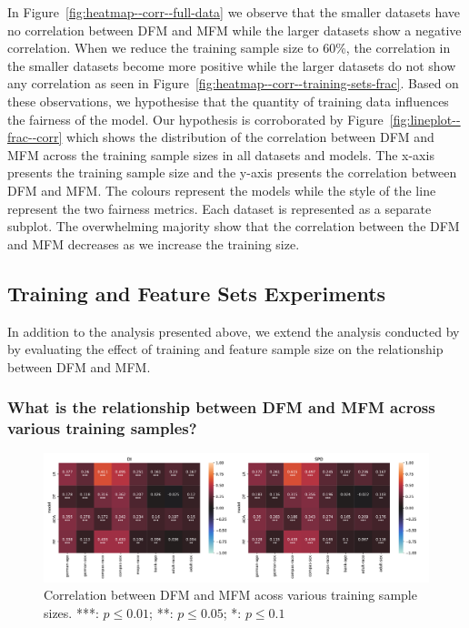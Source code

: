 \documentclass{article}
\begin{document}
In Figure \ref{fig:heatmap--corr--full-data} we observe that the
smaller datasets have no correlation between DFM and MFM while the
larger datasets show a negative correlation. When we reduce the
training sample size to 60\%, the correlation in the smaller datasets
become more positive while the larger datasets do not show any
correlation as seen in
Figure \ref{fig:heatmap--corr--training-sets-frac}. Based on these
observations, we hypothesise that the quantity of training data
influences the fairness of the model. Our hypothesis is corroborated
by Figure \ref{fig:lineplot--frac--corr} which shows the distribution
of the correlation between DFM and MFM across the training sample
sizes in all datasets and models. The x-axis presents the training
sample size and the y-axis presents the correlation between DFM and
MFM. The colours represent the models while the style of the line
represent the two fairness metrics. Each dataset is represented as
a separate subplot. The overwhelming majority show that the
correlation between the DFM and MFM decreases as we increase the
training size.

\subsection{Training and Feature Sets
  Experiments}\label{sec:results-training-feature-sets}
In addition to the analysis presented above, we extend the analysis
conducted by \citeauthor{zhang2021ignorance} by evaluating the effect
of training and feature sample size on the relationship between DFM
and MFM.

\subsubsection{What is the relationship between DFM and MFM across
  various training samples?}\label{sec:results-training-sets}

\begin{figure}
  \centering
  \includegraphics[width=0.95\linewidth]{heatmap--corr--frac.pdf}
  \caption{Correlation between DFM and MFM acoss various training
  sample sizes. ***: $p\le0.01$; **: $p\le0.05$; *: $p\le0.1$}
  \label{fig:heatmap--corr--frac}
\end{figure}
\end{document}
